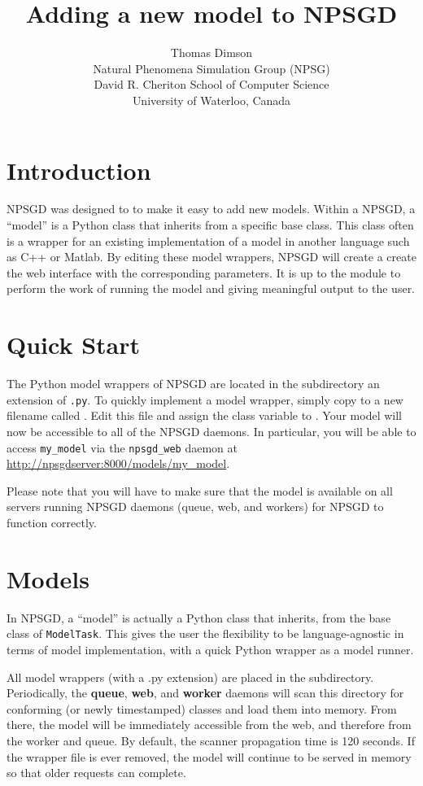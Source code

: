 \documentclass{article}
\title{Adding a new model to NPSGD}
\author{Thomas Dimson\\Natural Phenomena Simulation Group (NPSG)\\David R. Cheriton School of Computer Science\\University of Waterloo, Canada}
\newcommand{\mclass}[1]{\sloppy\texttt{#1}}
\begin{document}
\maketitle
\tableofcontents
\newpage

\section{Introduction}
NPSGD was designed to to make it easy to add new models. Within a NPSGD, a
``model'' is a Python class that inherits from a specific
base class. This class often is a wrapper for an existing implementation of a
model in another language such as C++ or Matlab. By editing these model wrappers, NPSGD
will create a create the web interface with the corresponding parameters. It is up to the
module to perform the work of running the model and giving meaningful output to
the user.

\section{Quick Start}
The Python model wrappers of NPSGD are located in the 
subdirectory an extension of \texttt{.py}. To quickly implement a model wrapper,
simply copy  to a
new filename called . Edit this file and assign the
 class variable to . Your model will now be
accessible to all of the NPSGD daemons. In particular, you will be able to
access \texttt{my\_model} via the \texttt{npsgd\_web} daemon at 
\url{http://npsgdserver:8000/models/my_model}.

Please note that you will have to make sure that the model is available on all
servers running NPSGD daemons (queue, web, and workers) for NPSGD to function
correctly.

\section{Models}
In NPSGD, a ``model'' is actually a Python class that inherits, 
from the base class of \mclass{ModelTask}. This gives the user the
flexibility to be language-agnostic in terms of model implementation, with a
quick Python wrapper as a model runner.

All model wrappers (with a .py extension) are placed in the  subdirectory.
Periodically, the \textbf{queue}, \textbf{web},
and \textbf{worker} daemons will scan this directory for conforming (or newly
timestamped) classes and load them into memory. From there, the model will be
immediately accessible from the web, and therefore from the worker and queue. By
default, the scanner propagation time is 120 seconds. If the wrapper file is
ever removed, the model will continue to be served in memory so that older
requests can complete.
\end{document}
